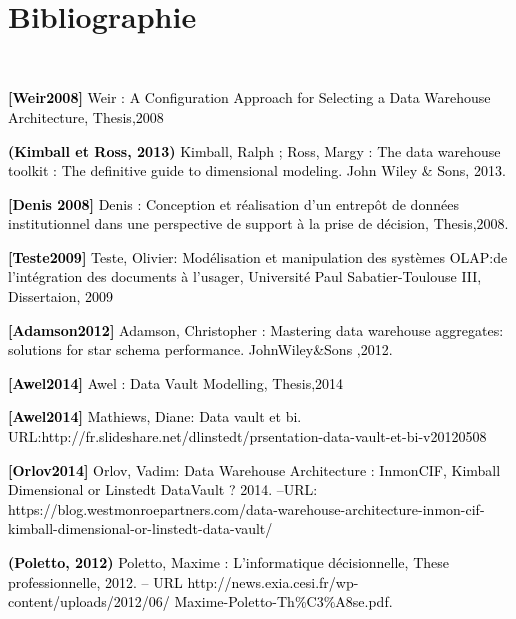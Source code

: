 \documentclass[a4paper,12pt]{report}
\begin{document}
\\
\chapter*{Bibliographie}
\\


	\item[] \textcolor{black}{
\textbf{[Weir2008]}  Weir : A Configuration Approach for Selecting a Data Warehouse Architecture, Thesis,2008}
\\

	\item[] \textcolor{black}{
\textbf{(Kimball et Ross, 2013)} Kimball, Ralph ; Ross, Margy : The data warehouse toolkit : The definitive guide to dimensional modeling. John Wiley \& Sons, 2013.	
}
\\

	\item[] \textcolor{black}{
\textbf{[Denis 2008]} Denis : Conception et réalisation d’un entrepôt de données institutionnel dans une perspective de support à la prise de décision, Thesis,2008.}
\\

	\item[] \textcolor{black}{
\textbf{[Teste2009]} Teste, Olivier: Modélisation et manipulation des systèmes OLAP:de l’intégration des documents à l’usager, Université Paul Sabatier-Toulouse III, Dissertaion, 2009}


	\item[] \textcolor{black}{
\textbf{[Adamson2012] } Adamson, Christopher : Mastering data warehouse aggregates: solutions for star schema performance. JohnWiley&Sons ,2012.}
\\

	\item[] \textcolor{black}{
\textbf{[Awel2014]}  Awel : Data Vault Modelling, Thesis,2014}
\\

	\item[] \textcolor{black}{
\textbf{[Awel2014]} Mathiews, Diane: Data vault et bi. URL:http://fr.slideshare.net/dlinstedt/prsentation-data-vault-et-bi-v20120508}
\\

	\item[] \textcolor{black}{
\textbf{[Orlov2014] } Orlov, Vadim: Data Warehouse Architecture : InmonCIF, Kimball Dimensional or Linstedt DataVault ? 2014. –URL: https://blog.westmonroepartners.com/data-warehouse-architecture-inmon-cif-kimball-dimensional-or-linstedt-data-vault/}
\\

	\item[] \textcolor{black}{
\textbf{(Poletto, 2012)} Poletto, Maxime : L’informatique décisionnelle, These professionnelle, 2012. – URL http://news.exia.cesi.fr/wp-content/uploads/2012/06/
Maxime-Poletto-Th\%C3\%A8se.pdf.}
\end{document}
